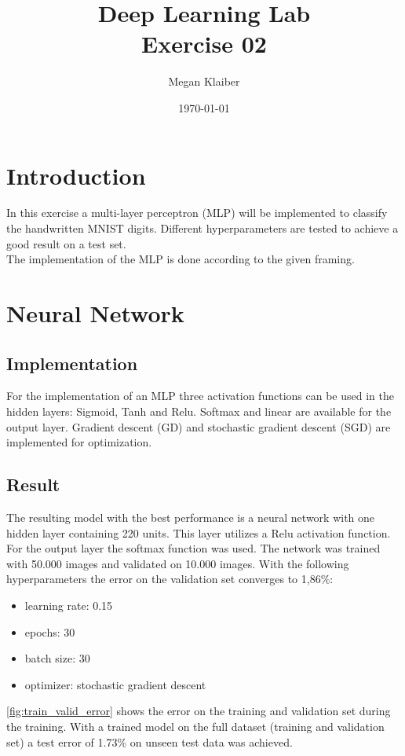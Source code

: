 \documentclass[a4paper,12pt]{article}
\begin{document}
\title{Deep Learning Lab \\ Exercise 02 }
\author{Megan Klaiber}
\date{\today}
\maketitle
\section{Introduction}
In this exercise a multi-layer perceptron (MLP) will be implemented to classify the handwritten MNIST digits. Different hyperparameters are tested to achieve a good result on a test set.\\
The implementation of the MLP is done according to the given framing.


\section{Neural Network}
\subsection{Implementation}
For the implementation of an MLP three activation functions can be used in the hidden layers: Sigmoid, Tanh and Relu. Softmax and linear are available for the output layer. Gradient descent (GD) and stochastic gradient descent (SGD) are implemented for optimization.

\subsection{Result}\label{result}
The resulting model with the best performance is a neural network with one hidden layer containing 220 units. This layer utilizes a Relu activation function. For the output layer the softmax function was used. The network was trained with 50.000 images and validated on 10.000 images. With the following hyperparameters the error on the validation set converges to 1,86\%:

\begin{itemize}
	\item learning rate: 0.15
	\item epochs: 30
	\item batch size: 30
	\item optimizer: stochastic gradient descent
\end{itemize}

\autoref{fig:train_valid_error} shows the error on the training and validation set during the training. With a trained model on the full dataset (training and validation set) a test error of 1.73\% on unseen test data was achieved.
\end{document}

